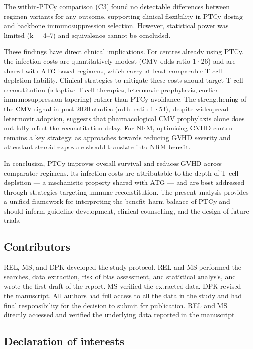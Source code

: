 \documentclass[
  british,
  8.6pt,
  a4paper,
  twocolumn]{article}
\begin{document}
The within-PTCy comparison (C3) found no detectable differences between
regimen variants for any outcome, supporting clinical flexibility in
PTCy dosing and backbone immunosuppression selection. However,
statistical power was limited (k = 4--7) and equivalence cannot be
concluded.

These findings have direct clinical implications. For centres already
using PTCy, the infection costs are quantitatively modest (CMV odds
ratio 1·26) and are shared with ATG-based regimens, which carry at least
comparable T-cell depletion liability. Clinical strategies to mitigate
these costs should target T-cell reconstitution (adoptive T-cell
therapies, letermovir prophylaxis, earlier immunosuppression tapering)
rather than PTCy avoidance. The strengthening of the CMV signal in
post-2020 studies (odds ratio 1·53), despite widespread letermovir
adoption, suggests that pharmacological CMV prophylaxis alone does not
fully offset the reconstitution delay. For NRM, optimising GVHD control
remains a key strategy, as approaches towards reducing GVHD severity and
attendant steroid exposure should translate into NRM benefit.

In conclusion, PTCy improves overall survival and reduces GVHD across
comparator regimens. Its infection costs are attributable to the depth
of T-cell depletion --- a mechanistic property shared with ATG --- and
are best addressed through strategies targeting immune reconstitution.
The present analysis provides a unified framework for interpreting the
benefit--harm balance of PTCy and should inform guideline development,
clinical counselling, and the design of future trials.

\subsection{Contributors}\label{contributors}

REL, MS, and DPK developed the study protocol. REL and MS performed the
searches, data extraction, risk of bias assessment, and statistical
analysis, and wrote the first draft of the report. MS verified the
extracted data. DPK revised the manuscript. All authors had full access
to all the data in the study and had final responsibility for the
decision to submit for publication. REL and MS directly accessed and
verified the underlying data reported in the manuscript.

\subsection{Declaration of interests}\label{declaration-of-interests}
\end{document}

